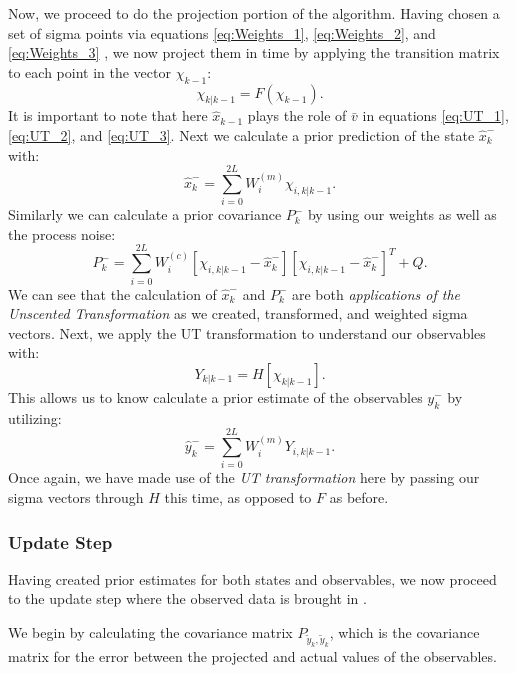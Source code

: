 \documentclass[review]{elsarticle}
\begin{document}
    Now, we proceed to do the projection portion of the algorithm. Having chosen a set of sigma points via equations \ref{eq:Weights_1}, \ref{eq:Weights_2}, and \ref{eq:Weights_3} , we now project them in time by applying the transition matrix to each point in the vector $\chi_{k-1}$:
    \begin{equation}
    \chi_{k|k-1} = F(\chi_{k-1}).
    \end{equation}
    It is important to note that here $\hat{x}_{k-1}$ plays the role of $\bar{v}$ in equations \ref{eq:UT_1}, \ref{eq:UT_2}, and \ref{eq:UT_3}.
    Next we calculate a prior prediction of the state $\hat{x}_k^-$ with:
    \begin{equation}
    \hat{x}_k^- = \sum_{i = 0}^{2L} W_i^{(m)} \chi_{i, k|k-1}.
    \end{equation}
    Similarly we can calculate a prior covariance $P_k^-$ by using our weights as well as the process noise:
    \begin{equation}
    P_k^- = \sum_{i = 0}^{2L} W_i^{(c)} [\chi_{i, k|k-1} - \hat{x}_k^-][\chi_{i, k|k-1} - \hat{x}_k^-]^T + Q.
    \end{equation}
    We can see that the calculation of $\hat{x}_k^-$ and $P_k^-$ are both \emph{applications of the Unscented Transformation} as we created, transformed, and weighted sigma vectors. Next, we apply the UT transformation to understand our observables with:
    \begin{equation}
    Y_{k|k-1} = H[\chi_{k|k-1}].
    \end{equation}
    This allows us to know calculate a prior estimate of the observables $y_k^-$ by utilizing:
    \begin{equation}
    \hat{y}_k^- = \sum_{i=0}^{2L} W_i^{(m)} Y_{i,k|k-1}.
    \end{equation}
     Once again, we have made use of the \emph{UT transformation} here by passing our sigma vectors through $H$ this time, as opposed to $F$ as before.
    \subsubsection{Update Step}
    Having created prior estimates for both states and observables, we now proceed to the update step where the observed data is brought in \cite{VanMereChapter}. 
    
    We begin by calculating the covariance matrix $P_{\tilde{y}_k, \tilde{y}_k}$, which is the covariance matrix for the error between the projected and actual values of the observables. 
    
\end{document}
